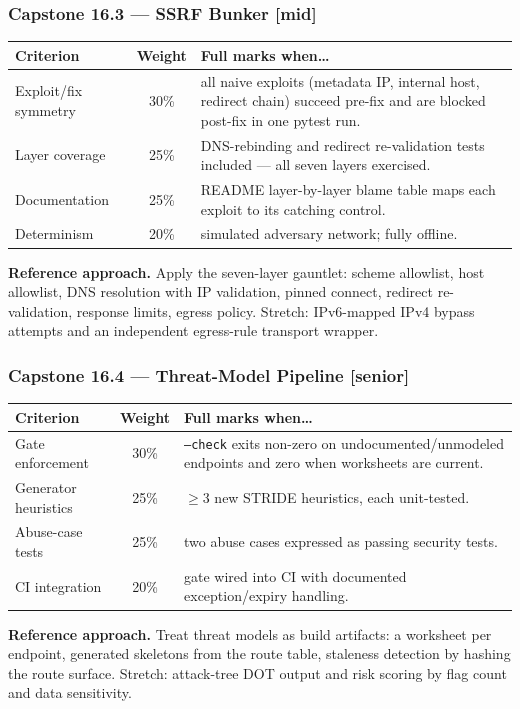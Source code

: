 \subsubsection*{Capstone 16.3 --- SSRF Bunker [mid]}
\begin{center}\small
\begin{tabularx}{\textwidth}{l c X}
\toprule
\textbf{Criterion} & \textbf{Weight} & \textbf{Full marks when\ldots} \\
\midrule
Exploit/fix symmetry & 30\% & all naive exploits (metadata IP, internal host, redirect chain) succeed pre-fix and are blocked post-fix in one pytest run. \\
Layer coverage & 25\% & DNS-rebinding and redirect re-validation tests included --- all seven layers exercised. \\
Documentation & 25\% & README layer-by-layer blame table maps each exploit to its catching control. \\
Determinism & 20\% & simulated adversary network; fully offline. \\
\bottomrule
\end{tabularx}
\end{center}
\textbf{Reference approach.} Apply the seven-layer gauntlet: scheme
allowlist, host allowlist, DNS resolution with IP validation, pinned
connect, redirect re-validation, response limits, egress policy. Stretch:
IPv6-mapped IPv4 bypass attempts and an independent egress-rule transport
wrapper.

\subsubsection*{Capstone 16.4 --- Threat-Model Pipeline [senior]}
\begin{center}\small
\begin{tabularx}{\textwidth}{l c X}
\toprule
\textbf{Criterion} & \textbf{Weight} & \textbf{Full marks when\ldots} \\
\midrule
Gate enforcement & 30\% & \texttt{--check} exits non-zero on undocumented/unmodeled endpoints and zero when worksheets are current. \\
Generator heuristics & 25\% & $\geq$3 new STRIDE heuristics, each unit-tested. \\
Abuse-case tests & 25\% & two abuse cases expressed as passing security tests. \\
CI integration & 20\% & gate wired into CI with documented exception/expiry handling. \\
\bottomrule
\end{tabularx}
\end{center}
\textbf{Reference approach.} Treat threat models as build artifacts: a
worksheet per endpoint, generated skeletons from the route table, staleness
detection by hashing the route surface. Stretch: attack-tree DOT output and
risk scoring by flag count and data sensitivity.

